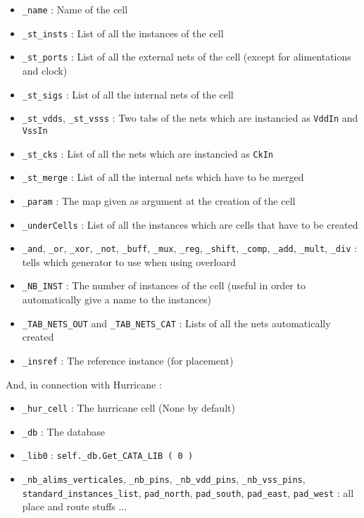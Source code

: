 \begin{itemize}
    \item \verb-_name- : Name of the cell
    \item \verb-_st_insts- : List of all the instances of the cell
    \item \verb-_st_ports- : List of all the external nets of the cell (except for alimentations and clock)
    \item \verb-_st_sigs- : List of all the internal nets of the cell
    \item \verb-_st_vdds-, \verb-_st_vsss- : Two tabs of the nets which are instancied as \verb-VddIn- and \verb-VssIn-
    \item \verb-_st_cks- : List of all the nets which are instancied as \verb-CkIn-
    \item \verb-_st_merge- : List of all the internal nets which have to be merged
    \item \verb-_param- : The map given as argument at the creation of the cell
    \item \verb-_underCells- : List of all the instances which are cells that have to be created 
    \item \verb-_and-, \verb-_or-, \verb-_xor-, \verb-_not-, \verb-_buff-, \verb-_mux-, \verb-_reg-, \verb-_shift-, \verb-_comp-, \verb-_add-, \verb-_mult-, \verb-_div- : tells which generator to use when using overloard
    \item \verb-_NB_INST- : The number of instances of the cell (useful in order to automatically give a name to the instances)
    \item \verb-_TAB_NETS_OUT- and \verb-_TAB_NETS_CAT- : Lists of all the nets automatically created
    \item \verb-_insref- : The reference instance (for placement)\\
\end{itemize}

\indent And, in connection with Hurricane :
\begin{itemize}
    \item \verb-_hur_cell- : The hurricane cell (None by default)
    \item \verb-_db- : The database
    \item \verb-_lib0- : \verb-self._db.Get_CATA_LIB ( 0 )-
    \item \verb-_nb_alims_verticales-, \verb-_nb_pins-, \verb-_nb_vdd_pins-, \verb-_nb_vss_pins-, \verb-standard_instances_list-, \verb-pad_north-, \verb-pad_south-, \verb-pad_east-, \verb-pad_west- : all place and route stuffs ...

\end{itemize}


